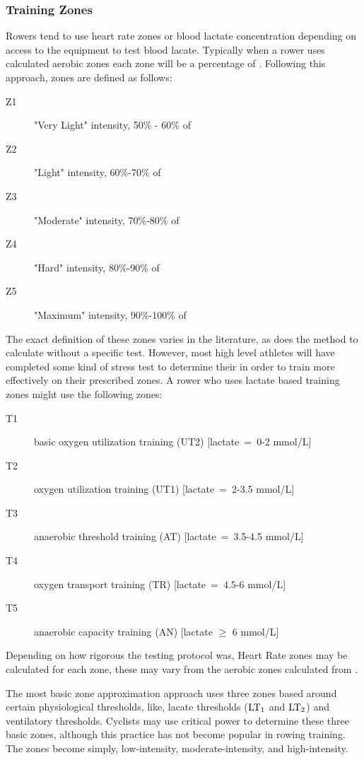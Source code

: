 \subsubsection{Training Zones}
Rowers tend to use heart rate zones or blood lactate concentration depending on access to the equipment to test blood lacate. Typically when a rower uses calculated aerobic zones each zone will be a percentage of \maxHR. Following this approach, zones are defined as follows:
\begin{description}
  \item[Z1] "Very Light" intensity, 50\% - 60\% of \maxHR
  \item[Z2] "Light" intensity, 60\%-70\% of \maxHR
  \item[Z3] "Moderate" intensity, 70\%-80\% of \maxHR
  \item[Z4] "Hard" intensity, 80\%-90\% of \maxHR
  \item[Z5] "Maximum" intensity, 90\%-100\% of \maxHR
\end{description}
The exact definition of these zones varies in the literature, as does the method to calculate \maxHR without a specific test. However, most high level athletes will have completed some kind of stress test to determine their \maxHR in order to train more effectively on their prescribed zones.
A rower who uses lactate based training zones might use the following zones:
\begin{description}
  \item[T1]  basic oxygen utilization training (UT2) [lactate~=~0-2 mmol/L]
  \item[T2]  oxygen utilization training (UT1) [lactate~=~2-3.5 mmol/L]
  \item[T3]  anaerobic threshold training (AT) [lactate~=~3.5-4.5 mmol/L]
  \item[T4]  oxygen transport training (TR) [lactate~=~4.5-6 mmol/L]
  \item[T5]  anaerobic capacity training (AN) [lactate $\geq$ 6 mmol/L] \autocite{Das2022}
\end{description}
Depending on how rigorous the testing protocol was, Heart Rate zones may be calculated for each zone, these may vary from the aerobic zones calculated from \maxHR.

The most basic zone approximation approach uses three zones based around certain physiological thresholds, like, lacate thresholds ($\textnormal{LT}_\text{1}$ and $\textnormal{LT}_\text{2}$) and ventilatory thresholds. Cyclists may use critical power to determine these three basic zones, although this practice has not become popular in rowing training. The zones become simply, low-intensity, moderate-intensity, and high-intensity. 

